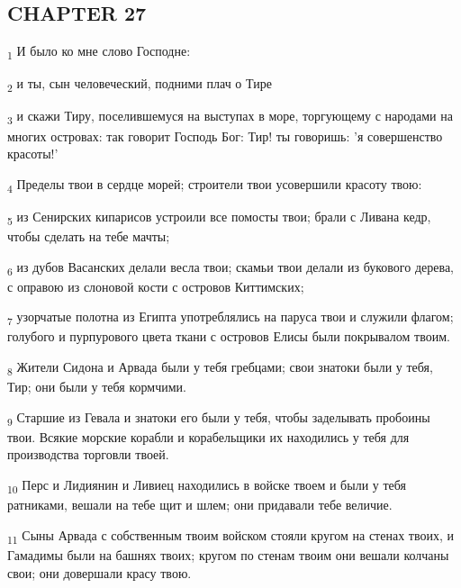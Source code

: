 \subsection{CHAPTER 27}
\begin{tcolorbox}
\textsubscript{1} И было ко мне слово Господне:
\end{tcolorbox}
\begin{tcolorbox}
\textsubscript{2} и ты, сын человеческий, подними плач о Тире
\end{tcolorbox}
\begin{tcolorbox}
\textsubscript{3} и скажи Тиру, поселившемуся на выступах в море, торгующему с народами на многих островах: так говорит Господь Бог: Тир! ты говоришь: 'я совершенство красоты!'
\end{tcolorbox}
\begin{tcolorbox}
\textsubscript{4} Пределы твои в сердце морей; строители твои усовершили красоту твою:
\end{tcolorbox}
\begin{tcolorbox}
\textsubscript{5} из Сенирских кипарисов устроили все помосты твои; брали с Ливана кедр, чтобы сделать на тебе мачты;
\end{tcolorbox}
\begin{tcolorbox}
\textsubscript{6} из дубов Васанских делали весла твои; скамьи твои делали из букового дерева, с оправою из слоновой кости с островов Киттимских;
\end{tcolorbox}
\begin{tcolorbox}
\textsubscript{7} узорчатые полотна из Египта употреблялись на паруса твои и служили флагом; голубого и пурпурового цвета ткани с островов Елисы были покрывалом твоим.
\end{tcolorbox}
\begin{tcolorbox}
\textsubscript{8} Жители Сидона и Арвада были у тебя гребцами; свои знатоки были у тебя, Тир; они были у тебя кормчими.
\end{tcolorbox}
\begin{tcolorbox}
\textsubscript{9} Старшие из Гевала и знатоки его были у тебя, чтобы заделывать пробоины твои. Всякие морские корабли и корабельщики их находились у тебя для производства торговли твоей.
\end{tcolorbox}
\begin{tcolorbox}
\textsubscript{10} Перс и Лидиянин и Ливиец находились в войске твоем и были у тебя ратниками, вешали на тебе щит и шлем; они придавали тебе величие.
\end{tcolorbox}
\begin{tcolorbox}
\textsubscript{11} Сыны Арвада с собственным твоим войском стояли кругом на стенах твоих, и Гамадимы были на башнях твоих; кругом по стенам твоим они вешали колчаны свои; они довершали красу твою.
\end{tcolorbox}
